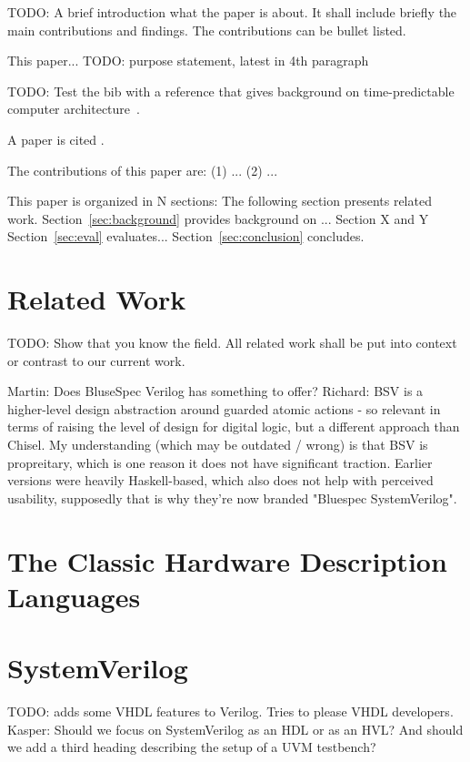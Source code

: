 \documentclass[a4paper, conference]{IEEEtran}
\newcommand{\todo}[1]{{\color{olive} TODO: #1}}
\newcommand{\martin}[1]{{\color{blue} Martin: #1}}
\newcommand{\ducky}[1]{{\color{orange} Richard: #1}}
\newcommand{\kasper}[1]{{\color{purple} Kasper: #1}}
\begin{document}
\todo{A brief introduction what the paper is about. It shall include briefly the
main contributions and findings. The contributions can be bullet listed.}

This paper... \todo{purpose statement, latest in 4th paragraph}

\todo{Test the bib with a reference that gives background on time-predictable
computer architecture~\cite{tpca:jes}.}

A paper is cited \cite{paper:example}.

The contributions of this paper are: (1) ... (2) ...

This paper is organized in N sections: The following section presents related work.
Section~\ref{sec:background} provides background on ...
Section X and Y 
Section~\ref{sec:eval} evaluates...
Section~\ref{sec:conclusion} concludes.

\section{Related Work}
\label{sec:related}

\todo{Show that you know the field. All related work shall be put
into context or contrast to our current work.}

\martin{Does BluseSpec Verilog has something to offer?}
\ducky{BSV is a higher-level design abstraction around guarded atomic actions - so relevant in terms of raising the level of design for digital logic, but a different approach than Chisel. My understanding (which may be outdated / wrong) is that BSV is propreitary, which is one reason it does not have significant traction. Earlier versions were heavily Haskell-based, which also does not help with perceived usability, supposedly that is why they're now branded "Bluespec SystemVerilog".}


\section{The Classic Hardware Description Languages}

\section{SystemVerilog}

\todo{adds some VHDL features to Verilog. Tries to please VHDL developers.}
\kasper{Should we focus on SystemVerilog as an HDL or as an HVL? And should we add a third heading describing the setup of a UVM testbench?} 
\end{document}
